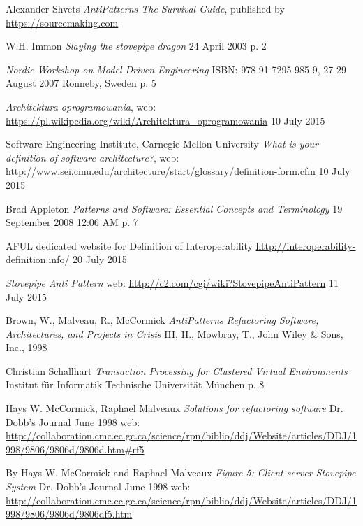 \begin{thebibliography}{9}
     
    Alexander Shvets
    \emph{AntiPatterns The Survival Guide},
    published by \url{https://sourcemaking.com}
    
    W.H. Immon
    \emph{Slaying the stovepipe dragon}
    24 April 2003
    p. 2
    
    \emph{Nordic Workshop on Model Driven Engineering}
    ISBN: 978-91-7295-985-9,
    27-29 August 2007 Ronneby, Sweden
    p. 5
    
    \emph{Architektura oprogramowania},
    web: \url{https://pl.wikipedia.org/wiki/Architektura_oprogramowania}
    10 July 2015
    
    Software Engineering Institute, Carnegie Mellon University
    \emph{What is your definition of software architecture?},
    web: \url{http://www.sei.cmu.edu/architecture/start/glossary/definition-form.cfm}
    10 July 2015
    
     Brad Appleton
     \emph{Patterns and Software: Essential Concepts and Terminology}
     19 September 2008 12:06 AM
     p. 7
     
    AFUL dedicated website for Definition of Interoperability
    \url{http://interoperability-definition.info/}
    20 July 2015
     
    \emph{Stovepipe Anti Pattern}
    web: \url{http://c2.com/cgi/wiki?StovepipeAntiPattern}
    11 July 2015
    
    Brown, W., Malveau, R., McCormick
    \emph{AntiPatterns Refactoring Software, Architectures, and Projects in Crisis}
    III, H., Mowbray, T., John Wiley \& Sons, Inc., 1998
    
    Christian Schallhart
    \emph{Transaction Processing for Clustered Virtual Environments}
    Institut für Informatik
    Technische Universität München
    p. 8
    
    Hays W. McCormick, Raphael Malveaux
    \emph{Solutions for refactoring software}
    Dr. Dobb's Journal June 1998
    web: \url{http://collaboration.cmc.ec.gc.ca/science/rpn/biblio/ddj/Website/articles/DDJ/1998/9806/9806d/9806d.htm#rf5}
    

    By Hays W. McCormick and Raphael Malveaux
    \emph{Figure 5: Client-server Stovepipe System}
    Dr. Dobb's Journal June 1998
    web: \url{http://collaboration.cmc.ec.gc.ca/science/rpn/biblio/ddj/Website/articles/DDJ/1998/9806/9806d/9806df5.htm}

\end{thebibliography}